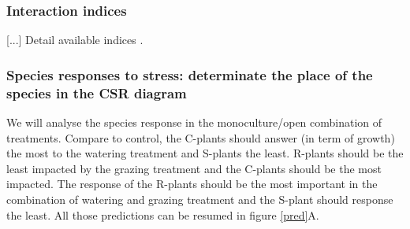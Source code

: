 \documentclass[12pt]{article} %
\begin{document}
\subsubsection{Interaction indices}
[...] Detail available indices \citep{Seifan2010}.

\subsubsection{Species responses to stress: determinate the place of the species in the CSR diagram}
We will analyse the species response in the monoculture/open combination of treatments. Compare to control, the C-plants should answer (in term of growth) the most to the watering treatment and S-plants the least. R-plants should be the least impacted by the grazing treatment and the C-plants should be the most impacted. The response of the R-plants should be the most important in the combination of watering and grazing treatment and the S-plant should response the least. All those predictions can be resumed in figure \ref{pred}A.
\end{document}
